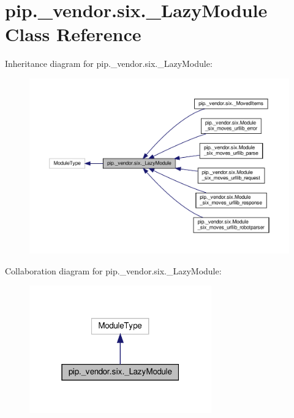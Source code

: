 \hypertarget{classpip_1_1__vendor_1_1six_1_1__LazyModule}{}\section{pip.\+\_\+vendor.\+six.\+\_\+\+Lazy\+Module Class Reference}
\label{classpip_1_1__vendor_1_1six_1_1__LazyModule}


Inheritance diagram for pip.\+\_\+vendor.\+six.\+\_\+\+Lazy\+Module\+:
\nopagebreak
\begin{figure}[H]
\begin{center}
\leavevmode
\includegraphics[width=350pt]{classpip_1_1__vendor_1_1six_1_1__LazyModule__inherit__graph}
\end{center}
\end{figure}


Collaboration diagram for pip.\+\_\+vendor.\+six.\+\_\+\+Lazy\+Module\+:
\nopagebreak
\begin{figure}[H]
\begin{center}
\leavevmode
\includegraphics[width=223pt]{classpip_1_1__vendor_1_1six_1_1__LazyModule__coll__graph}
\end{center}
\end{figure}
